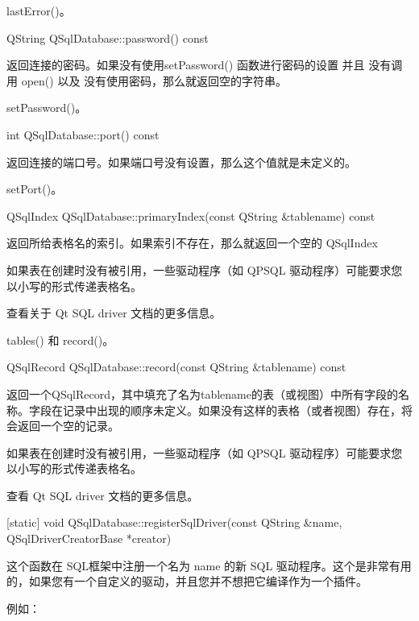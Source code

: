 \begin{seeAlso}
lastError()。
\end{seeAlso}

QString QSqlDatabase::password() const


返回连接的密码。如果没有使用setPassword() 函数进行密码的设置 并且 没有调用 open() 以及 没有使用密码，那么就返回空的字符串。


\begin{seeAlso}
setPassword()。
\end{seeAlso}

int QSqlDatabase::port() const


返回连接的端口号。如果端口号没有设置，那么这个值就是未定义的。

\begin{seeAlso}
setPort()。
\end{seeAlso}

QSqlIndex QSqlDatabase::primaryIndex(const QString \&tablename) const


返回所给表格名的索引。如果索引不存在，那么就返回一个空的 QSqlIndex

\begin{notice}
如果表在创建时没有被引用，一些驱动程序（如 QPSQL 驱动程序）可能要求您以小写的形式传递表格名。
\end{notice}


查看关于 Qt SQL driver 文档的更多信息。

\begin{seeAlso}
tables() 和 record()。
\end{seeAlso}


QSqlRecord QSqlDatabase::record(const QString \&tablename) const


返回一个QSqlRecord，其中填充了名为tablename的表（或视图）中所有字段的名称。字段在记录中出现的顺序未定义。如果没有这样的表格（或者视图）存在，将会返回一个空的记录。

\begin{notice}
如果表在创建时没有被引用，一些驱动程序（如 QPSQL 驱动程序）可能要求您以小写的形式传递表格名。
\end{notice}


查看 Qt SQL driver 文档的更多信息。

[static] void QSqlDatabase::registerSqlDriver(const QString \&name, QSqlDriverCreatorBase *creator)


这个函数在 SQL框架中注册一个名为 name 的新 SQL 驱动程序。这个是非常有用的，如果您有一个自定义的驱动，并且您并不想把它编译作为一个插件。

例如：


